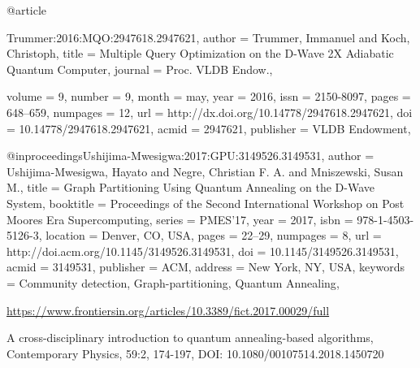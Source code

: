 \documentclass[conference]{IEEEtran}
\begin{document}
\begin{thebibliography}{00}
 @article{Trummer:2016:MQO:2947618.2947621,
author = {Trummer, Immanuel and Koch, Christoph},
title = {Multiple Query Optimization on the D-Wave 2X Adiabatic Quantum Computer},
journal = {Proc. VLDB Endow.},

volume = {9},
number = {9},
month = may,
year = {2016},
issn = {2150-8097},
pages = {648--659},
numpages = {12},
url = {http://dx.doi.org/10.14778/2947618.2947621},
doi = {10.14778/2947618.2947621},
acmid = {2947621},
publisher = {VLDB Endowment},
} 

 @inproceedings{Ushijima-Mwesigwa:2017:GPU:3149526.3149531,
author = {Ushijima-Mwesigwa, Hayato and Negre, Christian F. A. and Mniszewski, Susan M.},
title = {Graph Partitioning Using Quantum Annealing on the D-Wave System},
booktitle = {Proceedings of the Second International Workshop on Post Moores Era Supercomputing},
series = {PMES'17},
year = {2017},
isbn = {978-1-4503-5126-3},
location = {Denver, CO, USA},
pages = {22--29},
numpages = {8},
url = {http://doi.acm.org/10.1145/3149526.3149531},
doi = {10.1145/3149526.3149531},
acmid = {3149531},
publisher = {ACM},
address = {New York, NY, USA},
keywords = {Community detection, Graph-partitioning, Quantum Annealing},
} 

 \url{https://www.frontiersin.org/articles/10.3389/fict.2017.00029/full}

A cross-disciplinary introduction to quantum annealing-based algorithms, Contemporary Physics, 59:2, 174-197, DOI: 10.1080/00107514.2018.1450720


\end{thebibliography}
\end{document}
